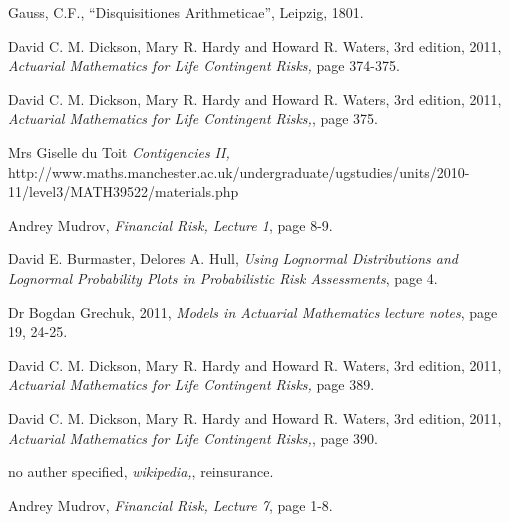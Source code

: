 \documentclass{report}
\begin{document}
\begin{thebibliography}{99}             %

 Gauss, C.F.,
    ``Disquisitiones Arithmeticae'', Leipzig, 1801.

  David C. M. Dickson, Mary R. Hardy and Howard R. Waters,
    3rd edition, 2011, 
    {\em Actuarial Mathematics for Life Contingent Risks,}
    page 374-375.

  David C. M. Dickson, Mary R. Hardy and Howard R. Waters,
    3rd edition, 2011, 
    {\em Actuarial Mathematics for Life Contingent Risks,},
    page 375.



  Mrs Giselle du Toit
    {\em Contigencies II,}
    http://www.maths.manchester.ac.uk/undergraduate/ugstudies/units/2010-11/level3/MATH39522/materials.php



  Andrey Mudrov,
    {\em Financial Risk, Lecture 1},
    page 8-9.



  David E. Burmaster, Delores A. Hull,
    {\em Using Lognormal Distributions and Lognormal Probability Plots in Probabilistic Risk Assessments},
    page 4.




  Dr Bogdan Grechuk,
    2011,
    {\em Models in Actuarial Mathematics lecture notes},
    page 19, 24-25.


  David C. M. Dickson, Mary R. Hardy and Howard R. Waters,
    3rd edition, 2011, 
    {\em Actuarial Mathematics for Life Contingent Risks,}
    page 389.


  David C. M. Dickson, Mary R. Hardy and Howard R. Waters,
    3rd edition, 2011, 
    {\em Actuarial Mathematics for Life Contingent Risks,},
    page 390.

  no auther specified,
    {\em wikipedia,},
    reinsurance.

  Andrey Mudrov,
    {\em Financial Risk, Lecture 7},
    page 1-8.











\end{thebibliography}
\end{document}
